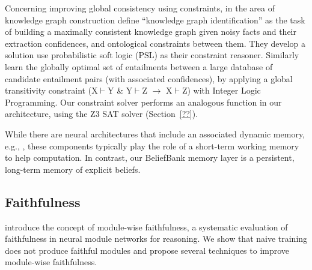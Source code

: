 \documentclass[11pt]{article}
\newcommand{\eat}[1]{}
\newcommand{\red}[1]{\textcolor{red}{#1}}
\begin{document}
Concerning improving global consistency using constraints,
in the area of knowledge graph construction
\citet{Pujara2013KnowledgeGI} define ``knowledge graph identification''
as the task of building a maximally consistent knowledge graph given noisy facts
and their extraction confidences, and ontological constraints between them.
They develop a solution use probabilistic soft logic (PSL) \cite{Broecheler2010ProbabilisticSL}
as their constraint reasoner. 
Similarly \citet{berant2010global} learn the globally
optimal set of entailments between a large database of candidate
entailment pairs (with associated confidences), by applying
a global transitivity constraint (X$\vdash$Y \& Y$\vdash$Z $\rightarrow$ X$\vdash$Z)
with Integer Logic Programming. Our constraint solver performs an analogous
function in our architecture, using the Z3 SAT solver (Section~\ref{??}).

While there are neural architectures that include an associated dynamic memory,
e.g., \cite{Henaff2017TrackingTW,Sukhbaatar2015EndToEndMN}, these components
typically play the role of a short-term working memory to help computation.
In contrast, our BeliefBank memory layer is a persistent, long-term memory of
explicit beliefs.


\subsection{Faithfulness}
\citet{subramanian-etal-2020-obtaining}
introduce the concept of module-wise faithfulness, a systematic evaluation of faithfulness in neural module networks for reasoning. We show that naive training does not produce faithful modules and propose several techniques to improve module-wise faithfulness. 

\eat{Work on \textbf{consistency in other domains}
includes \citep{du2019consistent} where  prediction
consistency in procedural text is improved. \citet{ribeiro-etal-2020-beyond} use consistency for more robust evaluation. \citet{li-etal-2019-logic} measure and mitigate inconsistency in natural language inference (NLI), and finally, \citet{camburu2020make} propose a method for measuring inconsistencies in NLI explanations \cite{camburu2018snli}.}
\end{document}
